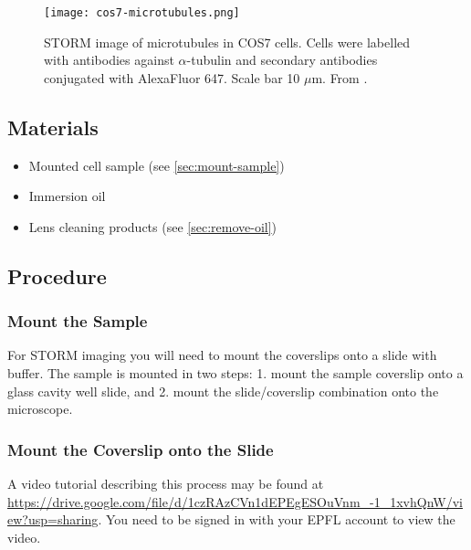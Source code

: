 \documentclass[10pt,a4paper,oneside]{book}
\begin{document}
\begin{figure}[ht]
    \centering
    \texttt{[image: cos7-microtubules.png]}
    \caption{STORM image of microtubules in COS7 cells. Cells were labelled with antibodies against $\alpha$-tubulin and secondary antibodies conjugated with AlexaFluor 647. Scale bar 10 $\mu$m. From \cite{douglass-naturephotonics-2016}.}
    \label{fig:cos7-microtubules}
\end{figure}

\subsection{Materials}

\begin{itemize}
    \item{Mounted cell sample (see \autoref{sec:mount-sample})}
    \item{Immersion oil}
    \item{Lens cleaning products (see \autoref{sec:remove-oil})}
\end{itemize}

\subsection{Procedure}

\subsubsection{Mount the Sample}\label{sec:mount-sample}

For STORM imaging you will need to mount the coverslips onto a slide with buffer. The sample is mounted in two steps: 1. mount the sample coverslip onto a glass cavity well slide, and 2. mount the slide/coverslip combination onto the microscope.

\subsubsection{Mount the Coverslip onto the Slide}

\newline

A video tutorial describing this process may be found at \url{https://drive.google.com/file/d/1czRAzCVn1dEPEgESOuVnm_-1_1xvhQnW/view?usp=sharing}. You need to be signed in with your EPFL account to view the video.
\end{document}
